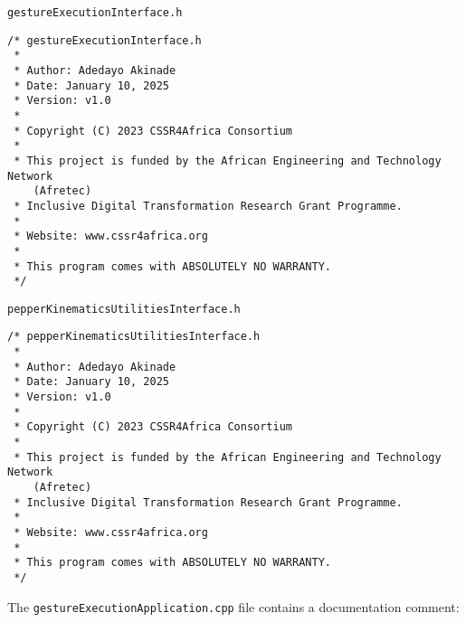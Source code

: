 \documentclass{CSSRforAfrica}
\newcommand{\blank}{~\\}
\newcommand{\checkboxChecked}{\fbox{\ding{51}}} %
\begin{document}
\begin{description}
\newpage
\item[\checkboxChecked] {\small \verb+gestureExecutionInterface.h+}   
{\small \begin{verbatim}
/* gestureExecutionInterface.h
 *
 * Author: Adedayo Akinade
 * Date: January 10, 2025
 * Version: v1.0
 * 
 * Copyright (C) 2023 CSSR4Africa Consortium
 * 
 * This project is funded by the African Engineering and Technology Network 
    (Afretec) 
 * Inclusive Digital Transformation Research Grant Programme. 
 *
 * Website: www.cssr4africa.org
 *
 * This program comes with ABSOLUTELY NO WARRANTY.
 */
\end{verbatim} }

\item[\checkboxChecked] {\small \verb+pepperKinematicsUtilitiesInterface.h+}   
{\small \begin{verbatim}
/* pepperKinematicsUtilitiesInterface.h
 *
 * Author: Adedayo Akinade
 * Date: January 10, 2025
 * Version: v1.0
 * 
 * Copyright (C) 2023 CSSR4Africa Consortium
 * 
 * This project is funded by the African Engineering and Technology Network 
    (Afretec) 
 * Inclusive Digital Transformation Research Grant Programme. 
 *
 * Website: www.cssr4africa.org
 *
 * This program comes with ABSOLUTELY NO WARRANTY.
 */
\end{verbatim} }

\end{description} 
%
\noindent The {\small \verb+gestureExecutionApplication.cpp+} file contains a documentation comment:
\end{document}
